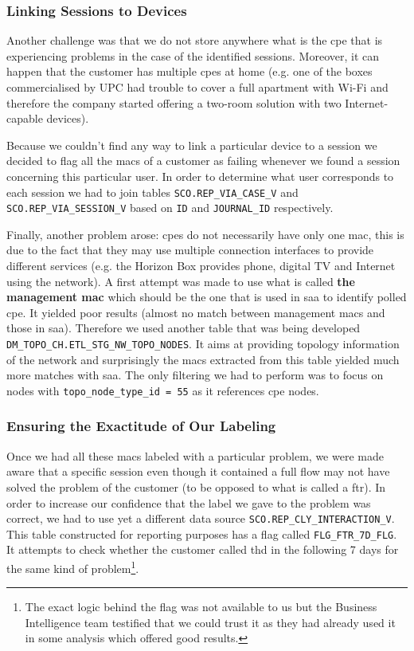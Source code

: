 \subsubsection{Linking Sessions to Devices}
Another challenge was that we do not store anywhere what is the \acrshort{cpe} that is experiencing problems in the case of the identified sessions. Moreover, it can happen that the customer has multiple \acrshort{cpe}s at home (e.g. one of the boxes commercialised by UPC had trouble to cover a full apartment with Wi-Fi and therefore the company started offering a two-room solution with two Internet-capable devices). 

Because we couldn't find any way to link a particular device to a session we decided to flag all the \acrshort{mac}s of a customer as failing whenever we found a session concerning this particular user. In order to determine what user corresponds to each session we had to join tables \texttt{SCO.REP\_VIA\_CASE\_V} and \texttt{SCO.REP\_VIA\_SESSION\_V} based on \texttt{ID} and \texttt{JOURNAL\_ID} respectively. 

Finally, another problem arose: \acrshort{cpe}s do not necessarily have only one \acrshort{mac}, this is due to the fact that they may use multiple connection interfaces to provide different services (e.g. the Horizon Box provides phone, digital TV and Internet using the network). A first attempt was made to use what is called \textbf{the management \acrshort{mac}} which should be the one that is used in \acrshort{saa} to identify polled \acrshort{cpe}. It yielded poor results (almost no match between management \acrshort{mac}s and those in \acrshort{saa}). Therefore we used another table that was being developed \texttt{DM\_TOPO\_CH.ETL\_STG\_NW\_TOPO\_NODES}. It aims at providing topology information of the network and surprisingly the \acrshort{mac}s extracted from this table yielded much more matches with \acrshort{saa}. The only filtering we had to perform was to focus on nodes with \texttt{topo\_node\_type\_id = 55} as it references \acrshort{cpe} nodes. 

\subsubsection{Ensuring the Exactitude of Our Labeling}
Once we had all these \acrshort{mac}s labeled with a particular problem, we were made aware that a specific session even though it contained a full flow may not have solved the problem of the customer (to be opposed to what is called a \acrfull{ftr}). In order to increase our confidence that the label we gave to the problem  was correct, we had to use yet a different data source \texttt{SCO.REP\_CLY\_INTERACTION\_V}. This table constructed for reporting purposes has a flag called \texttt{FLG\_FTR\_7D\_FLG}. It attempts to check whether the customer called \acrshort{thd} in the following 7 days for the same kind of problem\footnote{The exact logic behind the flag was not available to us but the Business Intelligence team testified that we could trust it as they had already used it in some analysis which offered good results.}. 

